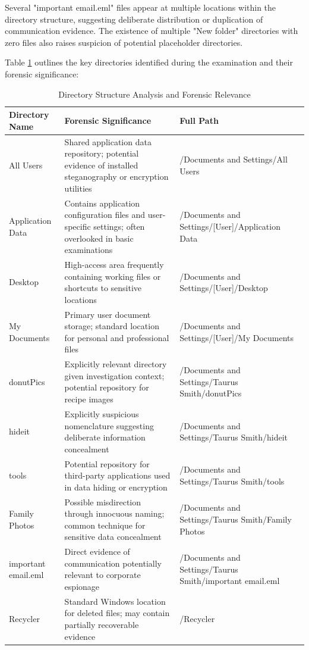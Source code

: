 Several "important email.eml" files appear at multiple locations within the directory structure, suggesting deliberate distribution or duplication of communication evidence. The existence of multiple "New folder" directories with zero files also raises suspicion of potential placeholder directories.

Table \ref{table:directory-analysis} outlines the key directories identified during the examination and their forensic significance:

\begin{table}[htbp]
\centering
\begin{tabular}{|p{3cm}|p{9cm}|p{4.5cm}|}
\hline
\textbf{Directory Name} & \textbf{Forensic Significance} & \textbf{Full Path} \\
\hline
All Users & Shared application data repository; potential evidence of installed steganography or encryption utilities & /Documents and Settings/All Users \\
\hline
Application Data & Contains application configuration files and user-specific settings; often overlooked in basic examinations & /Documents and Settings/[User]/Application Data \\
\hline
Desktop & High-access area frequently containing working files or shortcuts to sensitive locations & /Documents and Settings/[User]/Desktop \\
\hline
My Documents & Primary user document storage; standard location for personal and professional files & /Documents and Settings/[User]/My Documents \\
\hline
donutPics & Explicitly relevant directory given investigation context; potential repository for recipe images & /Documents and Settings/Taurus Smith/donutPics \\
\hline
hideit & Explicitly suspicious nomenclature suggesting deliberate information concealment & /Documents and Settings/Taurus Smith/hideit \\
\hline
tools & Potential repository for third-party applications used in data hiding or encryption & /Documents and Settings/Taurus Smith/tools \\
\hline
Family Photos & Possible misdirection through innocuous naming; common technique for sensitive data concealment & /Documents and Settings/Taurus Smith/Family Photos \\
\hline
important email.eml & Direct evidence of communication potentially relevant to corporate espionage & /Documents and Settings/Taurus Smith/important email.eml \\
\hline
Recycler & Standard Windows location for deleted files; may contain partially recoverable evidence & /Recycler \\
\hline
\end{tabular}
\caption{Directory Structure Analysis and Forensic Relevance}
\label{table:directory-analysis}
\end{table}

